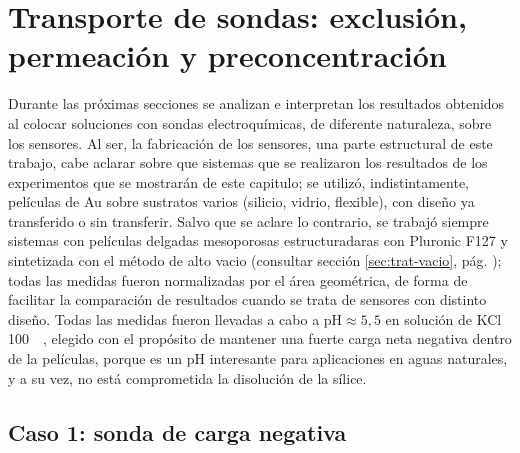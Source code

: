 	
				

\section{Transporte de sondas: exclusión, permeación y preconcentración}

	 Durante las próximas secciones se analizan e interpretan los resultados obtenidos al colocar soluciones con sondas electroquímicas, de diferente naturaleza, sobre los sensores. Al ser, la fabricación de los sensores, una parte estructural de este trabajo, cabe aclarar sobre que sistemas que se realizaron los resultados de los experimentos que se mostrarán de este capitulo; se utilizó, indistintamente, películas de Au sobre sustratos varios (silicio, vidrio, flexible), con diseño ya transferido o sin transferir. Salvo que se aclare lo contrario, se trabajó siempre sistemas con películas delgadas mesoporosas estructuradaras con Pluronic F127 y sintetizada con el método de alto vacio (consultar sección \ref{sec:trat-vacio}, pág. \pageref{sec:trat-vacio}); todas las medidas fueron normalizadas por el área geométrica, de forma de facilitar la comparación de resultados cuando se trata de sensores con distinto diseño. Todas las medidas fueron llevadas a cabo a $\text{pH}\approx5,5$ en solución de KCl \SI{100}{\milli\Molar}, elegido con el propósito de mantener una fuerte carga neta negativa dentro de la películas, porque es un pH interesante para aplicaciones en aguas naturales, y a su vez, no está comprometida la disolución de la sílice.

	\subsection{Caso 1: sonda de carga negativa}

